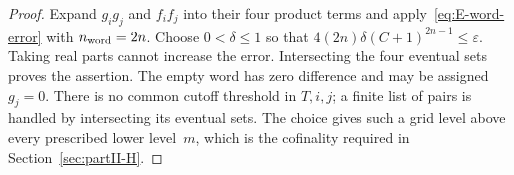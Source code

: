 \begin{proof}
Expand $g_ig_j$ and $f_if_j$ into their four product terms and apply~\eqref{eq:E-word-error} with $n_{\rm word}=2n$. Choose $0<\delta\le1$ so that $4(2n)\delta(C+1)^{2n-1}\le\varepsilon$. Taking real parts cannot increase the error. Intersecting the four eventual sets proves the assertion. The empty word has zero difference and may be assigned $g_j=0$. There is no common cutoff threshold in $T,i,j$; a finite list of pairs is handled by intersecting its eventual sets. The choice gives such a grid level above every prescribed lower level~$m$, which is the cofinality required in Section~\ref{sec:partII-H}.
\end{proof}
